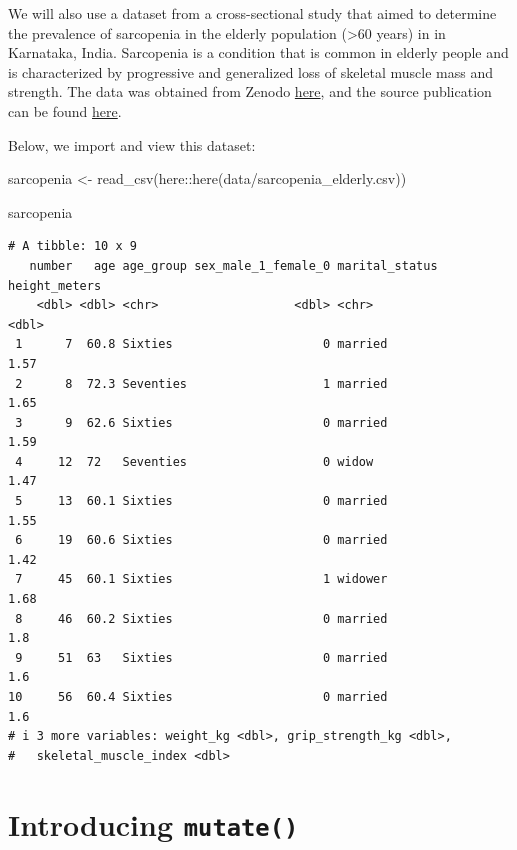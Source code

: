 \documentclass[
  letterpaper,
  DIV=11,
  numbers=noendperiod]{scrreprt}
\newenvironment{Shaded}{\begin{snugshade}}{\end{snugshade}}
\newcommand{\FunctionTok}[1]{\textcolor[rgb]{0.28,0.35,0.67}{#1}}
\newcommand{\NormalTok}[1]{\textcolor[rgb]{0.00,0.23,0.31}{#1}}
\newcommand{\OtherTok}[1]{\textcolor[rgb]{0.00,0.23,0.31}{#1}}
\newcommand{\SpecialCharTok}[1]{\textcolor[rgb]{0.37,0.37,0.37}{#1}}
\newcommand{\StringTok}[1]{\textcolor[rgb]{0.13,0.47,0.30}{#1}}
\begin{document}
We will also use a dataset from a cross-sectional study that aimed to
determine the prevalence of sarcopenia in the elderly population
(\textgreater60 years) in in Karnataka, India. Sarcopenia is a condition
that is common in elderly people and is characterized by progressive and
generalized loss of skeletal muscle mass and strength. The data was
obtained from Zenodo \href{https://zenodo.org/record/3691939}{here}, and
the source publication can be found
\href{https://doi.org/10.12688/f1000research.22580.1}{here}.

Below, we import and view this dataset:

\begin{Shaded}
\begin{Highlighting}[]
\NormalTok{sarcopenia }\OtherTok{\textless{}{-}} \FunctionTok{read\_csv}\NormalTok{(here}\SpecialCharTok{::}\FunctionTok{here}\NormalTok{(}\StringTok{\textquotesingle{}data/sarcopenia\_elderly.csv\textquotesingle{}}\NormalTok{))}

\NormalTok{sarcopenia}
\end{Highlighting}
\end{Shaded}

\begin{verbatim}
# A tibble: 10 x 9
   number   age age_group sex_male_1_female_0 marital_status height_meters
    <dbl> <dbl> <chr>                   <dbl> <chr>                  <dbl>
 1      7  60.8 Sixties                     0 married                 1.57
 2      8  72.3 Seventies                   1 married                 1.65
 3      9  62.6 Sixties                     0 married                 1.59
 4     12  72   Seventies                   0 widow                   1.47
 5     13  60.1 Sixties                     0 married                 1.55
 6     19  60.6 Sixties                     0 married                 1.42
 7     45  60.1 Sixties                     1 widower                 1.68
 8     46  60.2 Sixties                     0 married                 1.8 
 9     51  63   Sixties                     0 married                 1.6 
10     56  60.4 Sixties                     0 married                 1.6 
# i 3 more variables: weight_kg <dbl>, grip_strength_kg <dbl>,
#   skeletal_muscle_index <dbl>
\end{verbatim}

\hypertarget{introducing-mutate}{%
\section{\texorpdfstring{Introducing
\texttt{mutate()}}{Introducing mutate()}}\label{introducing-mutate}}
\end{document}

